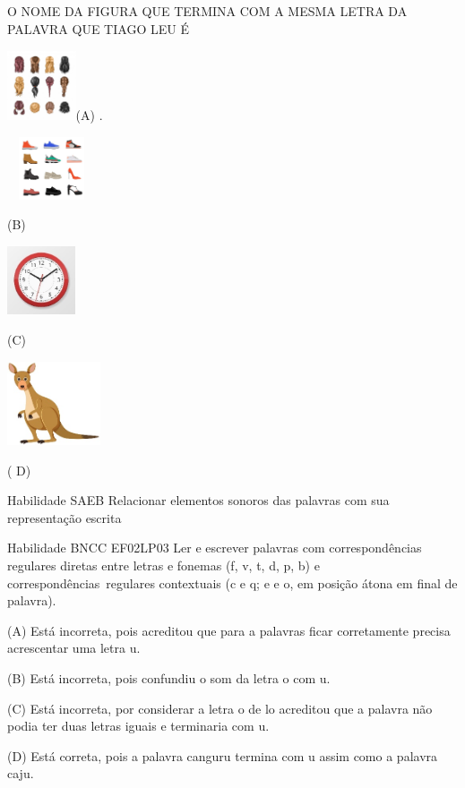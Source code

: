 O NOME DA FIGURA QUE TERMINA COM A MESMA LETRA DA PALAVRA QUE TIAGO LEU
É

\includegraphics[width=0.79792in,height=0.81667in]{media/image44.jpeg}(A)
.

\includegraphics[width=1.02847in,height=0.72292in]{media/image45.jpeg}

(B)

\includegraphics[width=0.79792in,height=0.79931in]{media/image46.jpeg}

(C)

\includegraphics[width=1.08611in,height=0.97222in]{media/image47.jpeg}

( D)

Habilidade SAEB Relacionar elementos sonoros das palavras com sua
representação escrita

Habilidade BNCC EF02LP03 Ler e escrever palavras com correspondências
regulares diretas entre letras e fonemas (f, v, t, d, p, b) e
correspondências~regulares contextuais (c e q; e e o, em posição átona
em final de palavra).

(A) Está incorreta, pois acreditou que para a palavras ficar
corretamente precisa acrescentar uma letra u.

(B) Está incorreta, pois confundiu o som da letra o com u.

(C) Está incorreta, por considerar a letra o de lo acreditou que a
palavra não podia ter duas letras iguais e terminaria com u.

(D) Está correta, pois a palavra canguru termina com u assim como a
palavra caju.

